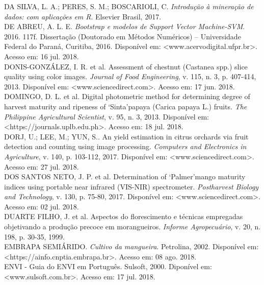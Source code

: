\noindent DA SILVA, L. A.; PERES, S. M.; BOSCARIOLI, C. \textit{Introdução à mineração de dados: com aplicações em R}. Elsevier Brasil, 2017.
\\

\noindent DE ABREU, A. L. E. \textit{Bootstrap e modelos de Support Vector Machine-SVM}. 2016. 117f. Dissertação (Doutorado em Métodos Numéricos) – Universidade Federal do Paraná, Curitiba, 2016. Disponível em: <www.acervodigital.ufpr.br>. Acesso em: 16 jul. 2018.
\\

\noindent DONIS-GONZÁLEZ, I. R. et al. Assessment of chestnut (Castanea spp.) slice quality using color images. \textit{Journal of Food Engineering}, v. 115, n. 3, p. 407-414, 2013. Disponível em: <www.sciencedirect.com>. Acesso em: 17 jun. 2018.
\\

\noindent DOMINGO, D. L. et al. Digital photometric method for determining degree of harvest maturity and ripeness of ‘Sinta’papaya (Carica papaya L.) fruits. \textit{The Philippine Agricultural Scientist}, v. 95, n. 3, 2013. Disponível em: <https://journals.uplb.edu.ph>. Acesso em: 18 jul. 2018.
\\

\noindent DORJ, U.; LEE, M.; YUN, S.. An yield estimation in citrus orchards via fruit detection and counting using image processing. \textit{Computers and Electronics in Agriculture}, v. 140, p. 103-112, 2017. Disponível em: <www.sciencedirect.com>. Acesso em: 27 jul. 2018.
\\

\noindent DOS SANTOS NETO, J. P. et al. Determination of ‘Palmer’mango maturity indices using portable near infrared (VIS-NIR) spectrometer. \textit{Postharvest Biology and Technology}, v. 130, p. 75-80, 2017. Disponível em: <www.sciencedirect.com>. Acesso em: 02 jul. 2018. 
\\

\noindent DUARTE FILHO, J. et al. Aspectos do florescimento e técnicas empregadas objetivando a produção precoce em morangueiros. \textit{Informe Agropecuário}, v. 20, n. 198, p. 30-35, 1999. 
\\

\noindent EMBRAPA SEMIÁRIDO. \textit{Cultivo da mangueira}. Petrolina, 2002. Disponível em: <https://ainfo.cnptia.embrapa.br>. Acesso em: 08 ago. 2018.
\\

\noindent ENVI - Guia do ENVI em Português. Sulsoft, 2000. Diponível em: <www.sulsoft.com.br>. Acesso em: 17 jul. 2018.
\\

